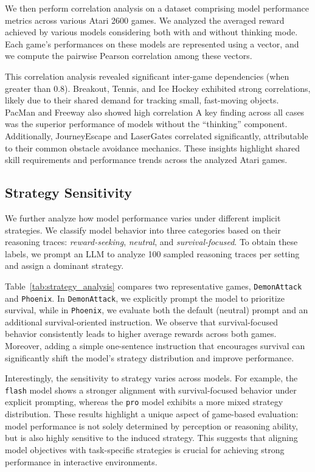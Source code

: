 We then perform correlation analysis on a dataset comprising model performance metrics across various Atari 2600 games.
We analyzed the averaged reward achieved by various models considering both with and without thinking mode. Each game's performances on these models are represented using a vector, and we compute the pairwise Pearson correlation among these vectors.

This correlation analysis revealed significant inter-game dependencies (when greater than 0.8). Breakout, Tennis, and Ice Hockey exhibited strong correlations, likely due to their shared demand for tracking small, fast-moving objects. PacMan and Freeway also showed high correlation A key finding across all cases was the superior performance of models without the ``thinking'' component. Additionally, JourneyEscape and LaserGates correlated significantly, attributable to their common obstacle avoidance mechanics. These insights highlight shared skill requirements and performance trends across the analyzed Atari games.

\subsection{Strategy Sensitivity}

We further analyze how model performance varies under different implicit strategies. We classify model behavior into three categories based on their reasoning traces: \emph{reward-seeking}, \emph{neutral}, and \emph{survival-focused}. To obtain these labels, we prompt an LLM to analyze 100 sampled reasoning traces per setting and assign a dominant strategy.

Table~\ref{tab:strategy_analysis} compares two representative games, \texttt{DemonAttack} and \texttt{Phoenix}. In \texttt{DemonAttack}, we explicitly prompt the model to prioritize survival, while in \texttt{Phoenix}, we evaluate both the default (neutral) prompt and an additional survival-oriented instruction. We observe that survival-focused behavior consistently leads to higher average rewards across both games. Moreover, adding a simple one-sentence instruction that encourages survival can significantly shift the model's strategy distribution and improve performance.

Interestingly, the sensitivity to strategy varies across models. For example, the \texttt{flash} model shows a stronger alignment with survival-focused behavior under explicit prompting, whereas the \texttt{pro} model exhibits a more mixed strategy distribution. These results highlight a unique aspect of game-based evaluation: model performance is not solely determined by perception or reasoning ability, but is also highly sensitive to the induced strategy. This suggests that aligning model objectives with task-specific strategies is crucial for achieving strong performance in interactive environments.

